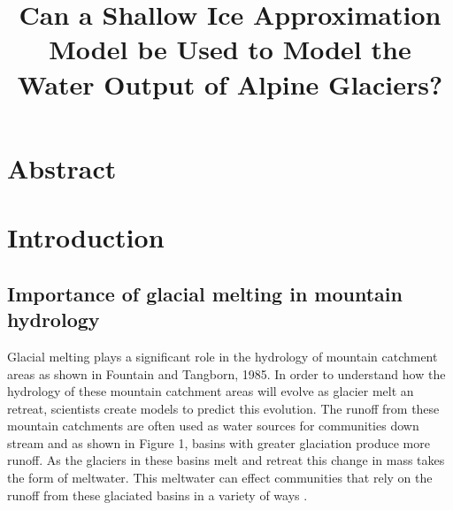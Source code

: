 \documentclass{article}
\title{Can a Shallow Ice Approximation Model be Used to Model the Water Output of Alpine Glaciers?}
\author{}
\date{}
\begin{document}
\maketitle

\section*{Abstract}

\section{Introduction}
\subsection{Importance of glacial melting in mountain hydrology}
Glacial melting plays a significant role in the hydrology of mountain catchment areas as shown in Fountain and Tangborn, 1985. In order to 
understand how the hydrology of these mountain catchment areas will evolve as glacier melt an retreat, scientists create models to predict 
this evolution. The runoff from these mountain catchments are often used as water sources for communities down stream \cite{ref1} and as shown in 
Figure 1, basins with greater glaciation produce more runoff. As the glaciers in these basins melt and retreat this change in mass takes the 
form of meltwater. This meltwater can effect communities that rely on the runoff from these glaciated basins in a variety of ways \cite{ref2}.
\end{document}
